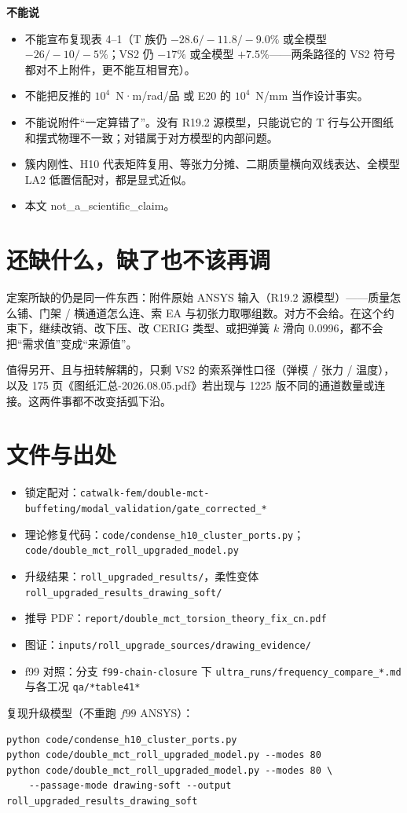 \documentclass[11pt,a4paper]{ctexart}
\begin{document}
\textbf{不能说}
\begin{itemize}
  \item 不能宣布复现表 4--1（T 族仍 $-28.6/-11.8/-9.0\%$ 或全模型 $-26/-10/-5\%$；VS2 仍 $-17\%$ 或全模型 $+7.5\%$——两条路径的 VS2 符号都对不上附件，更不能互相冒充）。
  \item 不能把反推的 $10^{4}$~N·m/rad/品 或 E20 的 $10^{4}$~N/mm 当作设计事实。
  \item 不能说附件``一定算错了''。没有 R19.2 源模型，只能说它的 T 行与公开图纸和摆式物理不一致；对错属于对方模型的内部问题。
  \item 簇内刚性、H10 代表矩阵复用、等张力分摊、二期质量横向双线表达、全模型 LA2 低置信配对，都是显式近似。
  \item 本文 not\_a\_scientific\_claim。
\end{itemize}

\section{还缺什么，缺了也不该再调}

定案所缺的仍是同一件东西：附件原始 ANSYS 输入（R19.2 源模型）——质量怎么铺、门架 / 横通道怎么连、索 EA 与初张力取哪组数。对方不会给。在这个约束下，继续改销、改下压、改 CERIG 类型、或把弹簧 $k$ 滑向 0.0996，都不会把``需求值''变成``来源值''。

值得另开、且与扭转解耦的，只剩 VS2 的索系弹性口径（弹模 / 张力 / 温度），以及 175 页《图纸汇总-2026.08.05.pdf》若出现与 1225 版不同的通道数量或连接。这两件事都不改变括弧下沿。

\appendix
\section{文件与出处}

\begin{itemize}
  \item 锁定配对：\texttt{catwalk-fem/double-mct-buffeting/modal\_validation/gate\_corrected\_*}
  \item 理论修复代码：\texttt{code/condense\_h10\_cluster\_ports.py}；
        \newline\texttt{code/double\_mct\_roll\_upgraded\_model.py}
  \item 升级结果：\texttt{roll\_upgraded\_results/}，柔性变体 \texttt{roll\_upgraded\_results\_drawing\_soft/}
  \item 推导 PDF：\texttt{report/double\_mct\_torsion\_theory\_fix\_cn.pdf}
  \item 图证：\texttt{inputs/roll\_upgrade\_sources/drawing\_evidence/}
  \item f99 对照：分支 \texttt{f99-chain-closure} 下
        \texttt{ultra\_runs/frequency\_compare\_*.md} 与各工况 \texttt{qa/*table41*}
\end{itemize}

复现升级模型（不重跑 $f99$ ANSYS）：
\begin{verbatim}
python code/condense_h10_cluster_ports.py
python code/double_mct_roll_upgraded_model.py --modes 80
python code/double_mct_roll_upgraded_model.py --modes 80 \
    --passage-mode drawing-soft --output roll_upgraded_results_drawing_soft
\end{verbatim}
\end{document}
